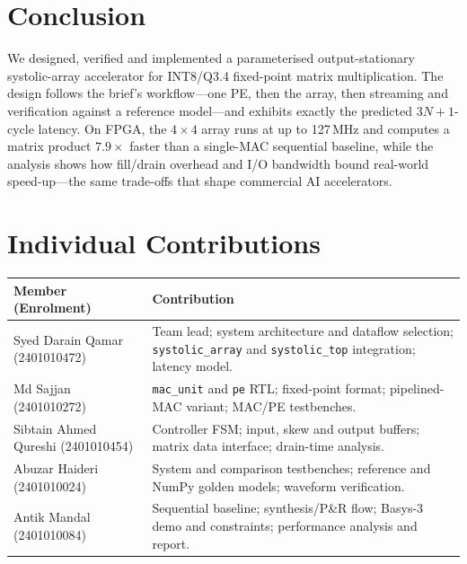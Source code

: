 \documentclass[conference]{IEEEtran}
\begin{document}
\section{Conclusion}
We designed, verified and implemented a parameterised output-stationary
systolic-array accelerator for INT8/Q3.4 fixed-point matrix multiplication.
The design follows the brief's workflow---one PE, then the array, then
streaming and verification against a reference model---and exhibits exactly
the predicted $3N+1$-cycle latency. On FPGA, the $4\times4$ array runs at
up to 127\,MHz and computes a matrix product $7.9\times$ faster than a
single-MAC sequential baseline, while the analysis shows how fill/drain
overhead and I/O bandwidth bound real-world speed-up---the same trade-offs
that shape commercial AI accelerators.

\section*{Individual Contributions}
\noindent\begin{minipage}{\columnwidth}
\centering
\setlength{\tabcolsep}{3pt}
\begin{tabular}{@{}>{\raggedright\arraybackslash}p{}>{\raggedright\arraybackslash}p{}@{}}
\toprule
Member (Enrolment) & Contribution\\
\midrule
Syed Darain Qamar (2401010472) & Team lead; system architecture and dataflow selection; \texttt{systolic\_array} and \texttt{systolic\_top} integration; latency model.\\
Md Sajjan (2401010272) & \texttt{mac\_unit} and \texttt{pe} RTL; fixed-point format; pipelined-MAC variant; MAC/PE testbenches.\\
Sibtain Ahmed Qureshi (2401010454) & Controller FSM; input, skew and output buffers; matrix data interface; drain-time analysis.\\
Abuzar Haideri (2401010024) & System and comparison testbenches; reference and NumPy golden models; waveform verification.\\
Antik Mandal (2401010084) & Sequential baseline; synthesis/P\&R flow; Basys-3 demo and constraints; performance analysis and report.\\
\bottomrule
\end{tabular}
\end{minipage}
\end{document}
